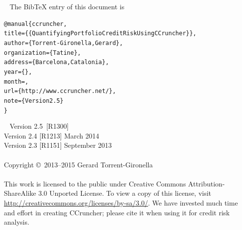 \documentclass[11pt,fleqn]{book} %
\def\numversion{2.5}
\def\svnversion{R1300}
\begin{document}

~\vfill
The BibTeX entry of this document is
\begin{alltt}
@manual\{ccruncher,
    title = \{\{Quantifying Portfolio Credit Risk Using CCruncher\}\},
    author = \{Torrent-Gironella, Gerard\},
    organization = \{Tatine\},
    address = \{Barcelona, Catalonia\},
    year = \{\the\year\}, 
    month = \shortmonthname,
    url = \{http://www.ccruncher.net/\},
    note = \{Version \numversion\}
\}
\end{alltt}

~\vfill
\thispagestyle{empty}
\noindent Version \numversion\ [\svnversion] \monthname\ \the\year\\ 
\noindent Version 2.4 [R1213] March 2014\\ 
\noindent Version 2.3 [R1151] September 2013\\ 
\\
\noindent Copyright \copyright\ 2013--2015 Gerard Torrent-Gironella\\
\\
\noindent 
This work is licensed to the public under Creative Commons 
Attribution-ShareAlike 3.0 Unported License. To view a copy 
of this license, visit 
\url{http://creativecommons.org/licenses/by-sa/3.0/}.
We have invested much time and effort in creating CCruncher; 
please cite it when using it for credit risk analysis.


\pagestyle{empty}
\setcounter{tocdepth}{1}
\tableofcontents
\cleardoublepage
\pagestyle{fancy}
\end{document}
